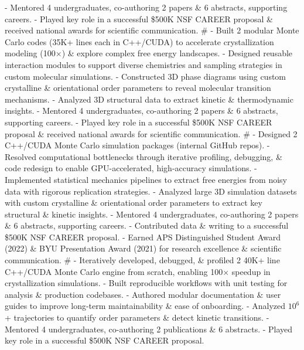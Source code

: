- Mentored 4 undergraduates, co-authoring 2 papers \& 6 abstracts, supporting careers.
- Played key role in a successful \$500K NSF CAREER proposal \& received national awards for scientific communication.
#
- Built 2 modular Monte Carlo codes (35K+ lines each in C++/CUDA) to accelerate crystallization modeling (100$\times$) \& explore complex free energy landscapes.
- Designed reusable interaction modules to support diverse chemistries and sampling strategies in custom molecular simulations.
- Constructed 3D phase diagrams using custom crystalline \& orientational order parameters to reveal molecular transition mechanisms.
- Analyzed 3D structural data to extract kinetic \& thermodynamic insights.%
- Mentored 4 undergraduates, co-authoring 2 papers \& 6 abstracts, supporting careers.
- Played key role in a successful \$500K NSF CAREER proposal \& received national awards for scientific communication.
#
- Designed 2 C++/CUDA Monte Carlo simulation packages (internal GitHub repos).%
- Resolved computational bottlenecks through iterative profiling, debugging, \& code redesign to enable GPU-accelerated, high-accuracy simulations.
- Implemented statistical mechanics pipelines to extract free energies from noisy data with rigorous replication strategies.
- Analyzed large 3D simulation datasets with custom crystalline \& orientational order parameters to extract key structural \& kinetic insights.
- Mentored 4 undergraduates, co-authoring 2 papers \& 6 abstracts, supporting careers.
- Contributed data \& writing to a successful \$500K NSF CAREER proposal.
- Earned APS Distinguished Student Award (2022) \& BYU Presentation Award (2021) for research excellence \& scientific communication.
#
- Iteratively developed, debugged, \& profiled 2 40K+ line C++/CUDA Monte Carlo engine from scratch, enabling 100$\times$ speedup in crystallization simulations.
- Built reproducible workflows with unit testing for analysis \& production codebases.
- Authored modular documentation \& user guides to improve long-term maintainability \& ease of onboarding.
- Analyzed $10^6$+ trajectories to quantify order parameters \& detect kinetic transitions.
- Mentored 4 undergraduates, co-authoring 2 publications \& 6 abstracts.
- Played key role in a successful \$500K NSF CAREER proposal.
